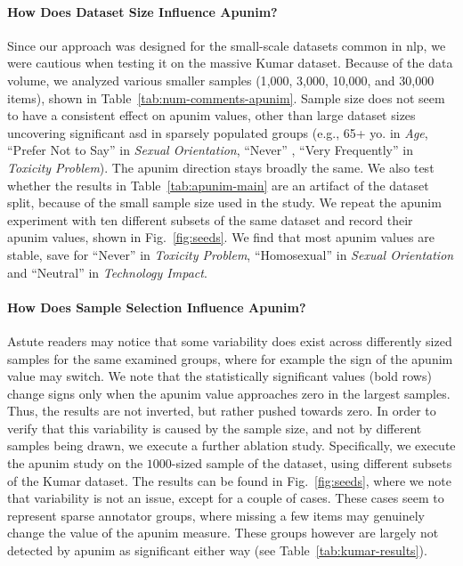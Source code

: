 \documentclass[manuscript,screen,review,anonymous]{acmart}
\theoremstyle{acmplain}
\theoremstyle{researchquestionstyle}
\begin{document}
\paragraph{How Does Dataset Size Influence Apunim?} Since our approach was designed for the small-scale datasets common in \ac{nlp}, we were cautious when testing it on the massive Kumar dataset. Because of the data volume, we analyzed various smaller samples (1{,}000, 3{,}000, 10{,}000, and 30{,}000 items), shown in Table~\ref{tab:num-comments-apunim}. Sample size does not seem to have a consistent effect on apunim values, other than large dataset sizes uncovering significant \ac{asd} in sparsely populated groups (e.g., 65+ yo. in \textit{Age}, ``Prefer Not to Say'' in \textit{Sexual Orientation}, ``Never'' , ``Very Frequently'' in \textit{Toxicity Problem}). The apunim direction stays broadly the same. We also test whether the results in Table~\ref{tab:apunim-main} are an artifact of the dataset split, because of the small sample size used in the study. We repeat the apunim experiment with ten different subsets of the same dataset and record their apunim values, shown in Fig.~\ref{fig:seeds}. We find that most apunim values are stable, save for ``Never'' in \textit{Toxicity Problem}, ``Homosexual'' in \textit{Sexual Orientation} and ``Neutral'' in \textit{Technology Impact}.

\paragraph{How Does Sample Selection Influence Apunim?}
Astute readers may notice that some variability does exist across differently sized samples for the same examined groups, where for example the sign of the apunim value may switch. We note that the statistically significant values (bold rows) change signs only when the apunim value approaches zero in the largest samples. Thus, the results are not inverted, but rather pushed towards zero. In order to verify that this variability is caused by the sample size, and not by different samples being drawn, we execute a further ablation study. Specifically, we execute the apunim study on the $1000$-sized sample of the dataset, using different subsets of the Kumar dataset. The results can be found in Fig.~\ref{fig:seeds}, where we note that variability is not an issue, except for a couple of cases. These cases seem to represent sparse annotator groups, where missing a few items may genuinely change the value of the apunim measure. These groups however are largely not detected by apunim as significant either way (see Table~\ref{tab:kumar-results}).
\end{document}
